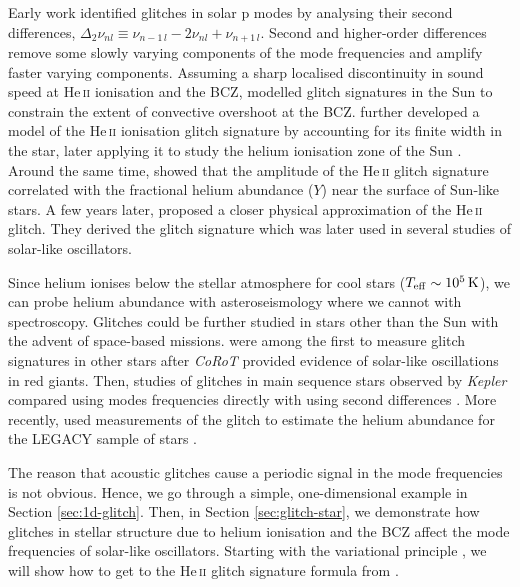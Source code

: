 Early work identified glitches in solar p modes by analysing their second differences, \(\Delta_2\nu_{nl} \equiv \nu_{n-1\,l} - 2\nu_{nl} + \nu_{n+1\,l}\). Second and higher-order differences remove some slowly varying components of the mode frequencies and amplify faster varying components. Assuming a sharp localised discontinuity in sound speed at He\,\textsc{ii} ionisation and the BCZ, \citet{Basu.Antia.ea1994,Basu1997} modelled glitch signatures in the Sun to constrain the extent of convective overshoot at the BCZ. \citet{Monteiro.Thompson1998} further developed a model of the He\,\textsc{ii} ionisation glitch signature by accounting for its finite width in the star, later applying it to study the helium ionisation zone of the Sun \citep{Monteiro.Thompson2005}. Around the same time, \citet{Basu.Mazumdar.ea2004} showed that the amplitude of the He\,\textsc{ii} glitch signature correlated with the fractional helium abundance (\(Y\)) near the surface of Sun-like stars. A few years later, \citet{Houdek.Gough2007} proposed a closer physical approximation of the He\,\textsc{ii} glitch. They derived the glitch signature which was later used in several studies of solar-like oscillators.

Since helium ionises below the stellar atmosphere for cool stars (\({T_\mathrm{eff}} \sim \SI{e5}{\kelvin}\)), we can probe helium abundance with asteroseismology where we cannot with spectroscopy. Glitches could be further studied in stars other than the Sun with the advent of space-based missions. \citet{Miglio.Montalban.ea2010,Mazumdar.Michel.ea2012} were among the first to measure glitch signatures in other stars after \emph{CoRoT} \citep{Baglin.Auvergne.ea2006} provided evidence of solar-like oscillations in red giants. Then, studies of glitches in main sequence stars observed by \emph{Kepler} \citep{Borucki.Koch.ea2010} compared using modes frequencies directly with using second differences \citep{Mazumdar.Monteiro.ea2012,Mazumdar.Monteiro.ea2014,Verma.Raodeo.ea2017}. More recently, \citet{Verma.Raodeo.ea2019} used measurements of the glitch to estimate the helium abundance for the LEGACY sample of stars \citet{Lund.SilvaAguirre.ea2017}.

The reason that acoustic glitches cause a periodic signal in the mode frequencies is not obvious. Hence, we go through a simple, one-dimensional example in Section \ref{sec:1d-glitch}. Then, in Section \ref{sec:glitch-star}, we demonstrate how glitches in stellar structure due to helium ionisation and the BCZ affect the mode frequencies of solar-like oscillators. Starting with the variational principle \citep{Chandrasekhar1964}, we will show how to get to the He\,\textsc{ii} glitch signature formula from \citet{Houdek.Gough2007}.

